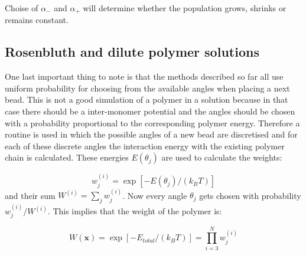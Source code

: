 Choise of $\alpha_-$ and $\alpha_+$ will determine whether the population grows, shrinks or remains constant.


\subsection*{Rosenbluth and dilute polymer solutions}
One last important thing to note is that the methods described so far all use uniform probability for choosing from the available angles when placing a next bead. This is not a good simulation of a polymer in a solution because in that case there should be a inter-monomer potential and the angles should be chosen with a probability proportional to the corresponding polymer energy.
Therefore a routine is used in which the possible angles of a new bead are discretised and for each of these discrete angles the interaction energy with the existing polymer chain is calculated. These energies $E\!\left(\theta_j\right)$ are used to calculate the weights:

\begin{equation}
	w_j^{(i)} = \exp [-E\left(\theta_j\right) / \left( k_B T \right)]
\end{equation}
and their sum $W^{(i)} = \sum_j w_j^{(i)}$. Now every angle $\theta_j$ gets chosen with probability $w_j^{(i)}/W^{(i)}$. This implies that the weight of the polymer is:

\begin{equation}
	W\!(\mathbf{x}) = \exp\left[-E_{total}/ \left( k_B T \right) \right] = \prod_{i=3}^{N} w_j^{(i)}
\end{equation}